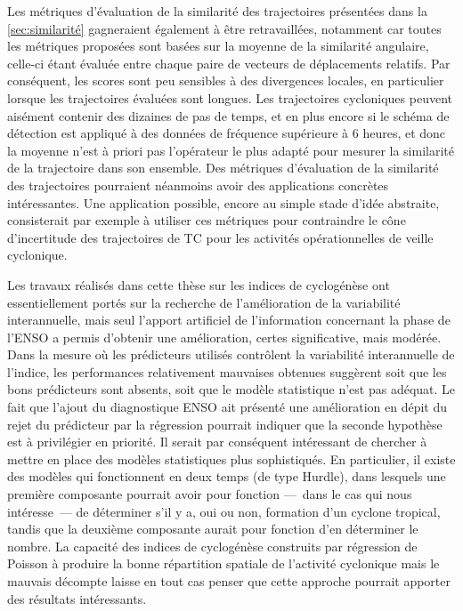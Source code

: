 \documentclass[../main.tex]{subfiles}
\begin{document}
Les métriques d'évaluation de la similarité des trajectoires présentées dans la \cref{sec:similarité} gagneraient également à être retravaillées, notamment car
toutes les métriques proposées sont basées sur la moyenne de la similarité angulaire, celle-ci étant évaluée entre chaque paire de vecteurs de déplacements
relatifs. Par conséquent, les scores sont peu sensibles à des divergences locales, en particulier lorsque les trajectoires évaluées sont longues. Les
trajectoires cycloniques peuvent aisément contenir des dizaines de pas de temps, et en plus encore si le schéma de détection est appliqué à des données de
fréquence supérieure à \num{6} heures, et donc la moyenne n'est à priori pas l'opérateur le plus adapté pour mesurer la similarité de la trajectoire dans son
ensemble. Des métriques d'évaluation de la similarité des trajectoires pourraient néanmoins avoir des applications concrètes intéressantes. Une application
possible, encore au simple stade d'idée abstraite, consisterait par exemple à utiliser ces métriques pour contraindre le cône d'incertitude des trajectoires de
TC pour les activités opérationnelles de veille cyclonique.

Les travaux réalisés dans cette thèse sur les indices de cyclogénèse ont essentiellement portés sur la recherche de l'amélioration de la variabilité
interannuelle, mais seul l'apport artificiel de l'information concernant la phase de l'ENSO a permis d'obtenir une amélioration, certes significative, mais
modérée. Dans la mesure où les prédicteurs utilisés contrôlent la variabilité interannuelle de l'indice, les performances relativement mauvaises obtenues
suggèrent soit que les bons prédicteurs sont absents, soit que le modèle statistique n'est pas adéquat. Le fait que l'ajout du diagnostique ENSO ait présenté
une amélioration en dépit du rejet du prédicteur par la régression pourrait indiquer que la seconde hypothèse est à privilégier en priorité. Il serait par
conséquent intéressant de chercher à mettre en place des modèles statistiques plus sophistiqués. En particulier, il existe des modèles qui fonctionnent en deux
temps (de type Hurdle), dans lesquels une première composante pourrait avoir pour fonction ---~dans le cas qui nous intéresse~--- de déterminer s'il y a, oui ou
non, formation d'un cyclone tropical, tandis que la deuxième composante aurait pour fonction d'en déterminer le nombre. La capacité des indices de cyclogénèse
construits par régression de Poisson à produire la bonne répartition spatiale de l'activité cyclonique mais le mauvais décompte laisse en tout cas penser que
cette approche pourrait apporter des résultats intéressants.
\end{document}
